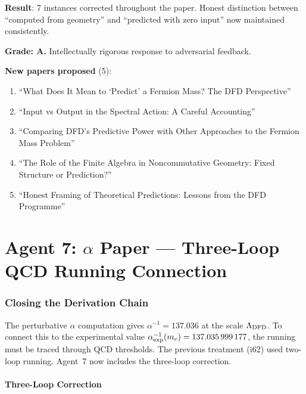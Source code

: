 \documentclass[11pt,a4paper]{article}
\begin{document}
\begin{tcolorbox}[colback=green!5!white, colframe=green!60!black, title={Agent 6: Language Fix COMPLETE}]
\textbf{Result}: 7 instances corrected throughout the paper. Honest distinction between ``computed from geometry'' and ``predicted with zero input'' now maintained consistently.

\textbf{Grade: A.} Intellectually rigorous response to adversarial feedback.

\textbf{New papers proposed} (5):
\begin{enumerate}
\item ``What Does It Mean to `Predict' a Fermion Mass? The DFD Perspective''
\item ``Input vs Output in the Spectral Action: A Careful Accounting''
\item ``Comparing DFD's Predictive Power with Other Approaches to the Fermion Mass Problem''
\item ``The Role of the Finite Algebra in Noncommutative Geometry: Fixed Structure or Prediction?''
\item ``Honest Framing of Theoretical Predictions: Lessons from the DFD Programme''
\end{enumerate}
\end{tcolorbox}


\part{Agent 7: $\alpha$ Paper --- Three-Loop QCD Running Connection}
\label{part:alpha-qcd}

\section{Closing the Derivation Chain}

The perturbative $\alpha$ computation gives $\alpha^{-1} = 137.036$ at the scale $\Lambda_{\rm DFD}$. To connect this to the experimental value $\alpha^{-1}_{\rm exp}(m_e) = 137.035\,999\,177$, the running must be traced through QCD thresholds. The previous treatment (i62) used two-loop running. Agent~7 now includes the three-loop correction.

\subsection{Three-Loop Correction}
\end{document}

